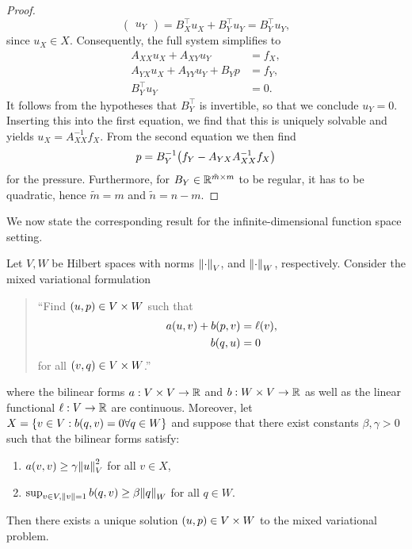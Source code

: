 \begin{proof}
\[\begin{pmatrix}
			u_Y
		\end{pmatrix} = B_X^\top u_X + B_Y^\top u_Y = B_Y^\top u_Y,
	\]
	since \(u_X \in X\).
	Consequently, the full system simplifies to
	\begin{align*}
		A_{XX}u_X + A_{XY}u_Y &= f_X,\\
		A_{YX}u_X + A_{YY}u_Y + B_Y p &= f_Y,\\
		B_Y^\top u_Y &= 0.
	\end{align*}
	It follows from the hypotheses that \(B_Y^\top\) is invertible, so that we conclude \(u_Y = 0\).
	Inserting this into the first equation, we find that this is uniquely solvable and yields \(u_X = A_{XX}^{-1} f_X\).
	From the second equation we then find
	\[
		p = B_Y^{-1}\parentheses*{f_Y - A_{YX}A_{XX}^{-1}f_X}
	\]
	for the pressure.
	Furthermore, for \(B_Y \in \R^{\tilde{m} \times m}\) to be regular, it has to be quadratic, hence \(\tilde{m} = m\) and \(\tilde{n} = n - m\).
\end{proof}

We now state the corresponding result for the infinite-dimensional function space setting.

\begin{theorem}
	Let \(V, W\) be Hilbert spaces with norms \(\norm*{\cdot}_V\), and \(\norm*{\cdot}_W\), respectively.
	Consider the mixed variational formulation
	\begin{quote}
		``Find \(\parentheses*{u, p} \in V \times W\) such that
		\begin{align*}
			a\parentheses*{u, v} + b\parentheses*{p, v} &= \ell\parentheses*{v},\\
			b\parentheses*{q, u} &= 0
		\end{align*}
		for all \(\parentheses*{v, q} \in V \times W\).''
	\end{quote}
	where the bilinear forms \(a: V \times V \to \R\) and \(b: W \times V \to \R\) as well as the linear functional \(\ell: V \to \R\) are continuous.
	Moreover, let \(X = \braces*{v \in V : b\parentheses*{q, v} = 0 \forall q \in W}\) and suppose that there exist constants \(\beta, \gamma > 0\) such that the bilinear forms satisfy:
	\begin{enumerate}
		\item \(a\parentheses*{v, v} \ge \gamma\norm*{u}_V^2\) for all \(v \in X\),
		\item \(\sup_{v \in V, \norm*{v} = 1}b\parentheses*{q, v} \ge \beta\norm*{q}_W\) for all \(q \in W\).
	\end{enumerate}
	Then there exists a unique solution \(\parentheses*{u, p} \in V \times W\) to the mixed variational problem.
\end{theorem}

